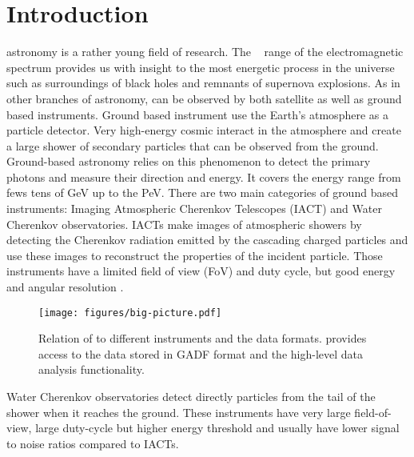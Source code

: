 \documentclass[traditabstract, longauth]{aa}
\begin{document}

\maketitle

\section{Introduction}
\label{sec:introduction}


\gammaray astronomy is a rather young field of research. The \gammaray~
range of the electromagnetic spectrum provides us with insight to the
most energetic process in the universe such as surroundings of
black holes and remnants of supernova explosions. As in other
branches of astronomy, \gammarays can be observed by both
satellite as well as ground based instruments.
Ground based instrument use the Earth's atmosphere as a particle detector.
Very high-energy cosmic \gammarays interact in the atmosphere and
create a large shower of secondary particles that can be observed from the ground.
Ground-based \gammaray astronomy relies on this phenomenon to detect the
primary \gammaray photons and measure their direction and energy.
It covers the energy range from fews tens of GeV up to the PeV.
There are two main categories of ground based instruments: 
Imaging Atmospheric Cherenkov Telescopes (IACT) and 
Water Cherenkov observatories. IACTs make images of atmospheric showers
by detecting the Cherenkov radiation emitted by the cascading charged particles and
use these images to reconstruct the properties of the incident particle.
Those instruments have a limited field of view (FoV) and duty cycle, but
good energy and angular resolution \citep{2015CRPhy..16..610D}.

\begin{figure*}[t]
	\centering
	\texttt{[image: figures/big-picture.pdf]}
    \caption{
        Relation of \gammapy to different \gammaray instruments and the data formats.
        \gammapy provides access to the data stored in GADF format and the
        high-level data analysis functionality.}
	\label{fig:big_picture}

\end{figure*}

Water Cherenkov observatories detect directly particles from the tail of the
shower when it reaches the ground. These instruments have very
large field-of-view, large duty-cycle but higher energy threshold and
usually have lower signal to noise ratios compared to IACTs.
\end{document}
